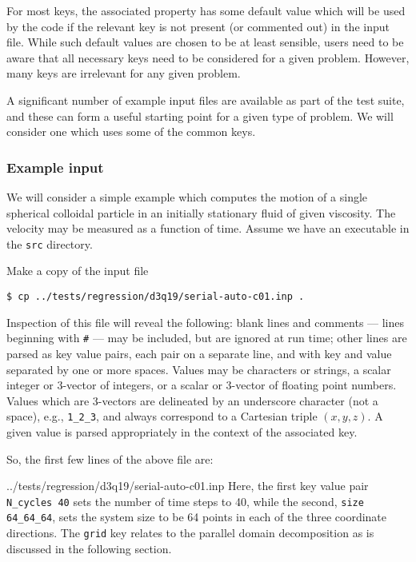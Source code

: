 For most keys, the associated property has some default value which
will be used by the code if the relevant key is not present (or
commented out) in the input file. While such default values are
chosen to be at least sensible, users need to be aware that all
necessary keys need to be considered for a given problem. However,
many keys are irrelevant for any given problem.

A significant number of example input files are available as
part of the test suite, and these can form a useful starting
point for a given type of problem. We will consider one which
uses some of the common keys.

\subsubsection{Example input}

We will consider a simple example which computes the motion of
a single spherical colloidal particle in an initially stationary
fluid of given viscosity. The velocity may be measured as a
function of time. Assume we have an executable in the \texttt{src}
directory.

Make a copy of the input file
\begin{lstlisting}
$ cp ../tests/regression/d3q19/serial-auto-c01.inp .
\end{lstlisting}

Inspection of this file will reveal the following: blank lines
and comments --- lines beginning with \texttt{\#} --- may be included,
but are ignored at run time; other lines are parsed as key value
pairs, each pair on a separate line, and with key and value separated
by one or more spaces. Values may be characters or strings, a
scalar integer or 3-vector of integers, or a scalar or 3-vector
of floating point numbers. Values which are 3-vectors are delineated
by an underscore character (not a space), e.g., \texttt{1\_2\_3},
and always correspond to a Cartesian triple $(x,y,z)$.
A given value is parsed appropriately in the context of the associated key.

So, the first few lines of the above file are:

{../tests/regression/d3q19/serial-auto-c01.inp}
Here, the first key value pair \texttt{N\_cycles 40} sets the number
of time steps to 40, while the second, \texttt{size 64\_64\_64}, sets
the system size to be 64 points in each of the three coordinate
directions. The \texttt{grid} key relates to the parallel
domain decomposition as is discussed in the following
section.

